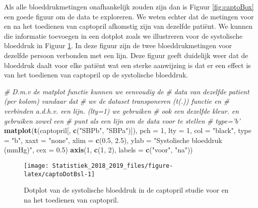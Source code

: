 \documentclass[12pt,dutch,coursenotes]{book}
\newenvironment{Shaded}{\begin{snugshade}}{\end{snugshade}}
\newcommand{\KeywordTok}[1]{\textcolor[rgb]{0.13,0.29,0.53}{\textbf{#1}}}
\newcommand{\DataTypeTok}[1]{\textcolor[rgb]{0.13,0.29,0.53}{#1}}
\newcommand{\DecValTok}[1]{\textcolor[rgb]{0.00,0.00,0.81}{#1}}
\newcommand{\FloatTok}[1]{\textcolor[rgb]{0.00,0.00,0.81}{#1}}
\newcommand{\StringTok}[1]{\textcolor[rgb]{0.31,0.60,0.02}{#1}}
\newcommand{\CommentTok}[1]{\textcolor[rgb]{0.56,0.35,0.01}{\textit{#1}}}
\newcommand{\NormalTok}[1]{#1}
\theoremstyle{definition}
\theoremstyle{definition}
\theoremstyle{definition}
\theoremstyle{remark}
\begin{document}
Als alle bloeddrukmetingen onafhankelijk zouden zijn dan is Figuur
\ref{fig:captoBox} een goede figuur om de data te exploreren. We weten
echter dat de metingen voor en na het toedienen van captopril afkomstig
zijn van dezelfde patiënt. We kunnen die informatie toevoegen in een
dotplot zoals we illustreren voor de systolische bloeddruk in Figuur
\ref{fig:captoDotBsl}. In deze figuur zijn de twee bloeddrukmetingen
voor dezelfde persoon verbonden met een lijn. Deze figuur geeft
duidelijk weer dat de bloeddruk daalt voor elke patiënt wat een sterke
aanwijzing is dat er een effect is van het toedienen van captopril op de
systolische bloeddruk.

\begin{Shaded}
\begin{Highlighting}[]
\CommentTok{# D.m.v de matplot functie kunnen we eenvoudig de}
\CommentTok{# data van dezelfde patient (per kolom) vandaar dat}
\CommentTok{# we de dataset transponeren (t(.)) functie en}
\CommentTok{# verbinden a.d.h.v. een lijn. (lty=1) we gebruiken}
\CommentTok{# ook een dezelfde kleur. en gebruiken zowel een}
\CommentTok{# punt als een lijn om de data voor te stellen}
\CommentTok{# type='b'}
\KeywordTok{matplot}\NormalTok{(}\KeywordTok{t}\NormalTok{(captopril[, }\KeywordTok{c}\NormalTok{(}\StringTok{"SBPb"}\NormalTok{, }\StringTok{"SBPa"}\NormalTok{)]), }\DataTypeTok{pch =} \DecValTok{1}\NormalTok{, }
    \DataTypeTok{lty =} \DecValTok{1}\NormalTok{, }\DataTypeTok{col =} \StringTok{"black"}\NormalTok{, }\DataTypeTok{type =} \StringTok{"b"}\NormalTok{, }\DataTypeTok{xaxt =} \StringTok{"none"}\NormalTok{, }
    \DataTypeTok{xlim =} \KeywordTok{c}\NormalTok{(}\FloatTok{0.5}\NormalTok{, }\FloatTok{2.5}\NormalTok{), }\DataTypeTok{ylab =} \StringTok{"Systolische bloeddruk (mmHg)"}\NormalTok{, }
    \DataTypeTok{cex =} \FloatTok{0.5}\NormalTok{)}
\KeywordTok{axis}\NormalTok{(}\DecValTok{1}\NormalTok{, }\KeywordTok{c}\NormalTok{(}\DecValTok{1}\NormalTok{, }\DecValTok{2}\NormalTok{), }\DataTypeTok{labels =} \KeywordTok{c}\NormalTok{(}\StringTok{"voor"}\NormalTok{, }\StringTok{"na"}\NormalTok{))}
\end{Highlighting}
\end{Shaded}

\begin{figure}

{\centering \texttt{[image: Statistiek\_2018\_2019\_files/figure-latex/captoDotBsl-1]} 

}

\caption{Dotplot van de systolische bloeddruk in de captopril studie voor en na het toedienen van captopril.}\label{fig:captoDotBsl}
\end{figure}
\end{document}
